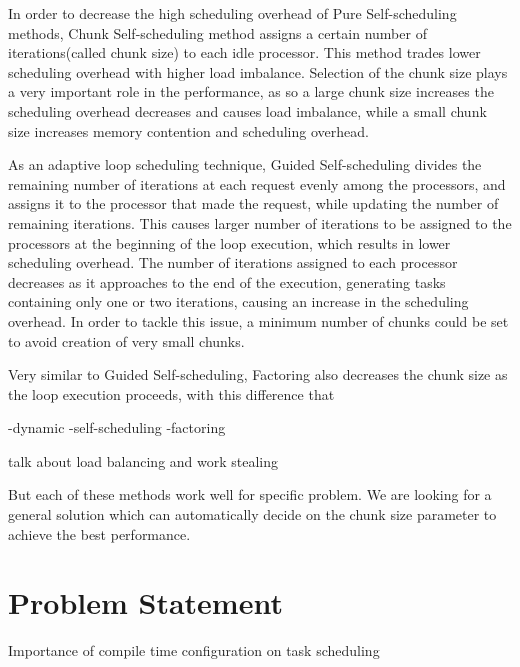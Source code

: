 In order to decrease the high scheduling overhead of Pure Self-scheduling
methods, Chunk Self-scheduling method assigns a certain number of
iterations(called chunk size) to each idle processor. This method trades lower
scheduling overhead with higher load imbalance. Selection of the chunk size
plays a very important role in the performance, as so a large chunk size
increases the scheduling overhead decreases and causes load imbalance, while a
small chunk size increases memory contention and scheduling
overhead\cite{liu1994safe}. 

As an adaptive loop scheduling technique, Guided
Self-scheduling\cite{polychronopoulos1987guided} divides the remaining number of
iterations at each request evenly among the processors, and assigns it to the
processor that made the request, while updating the number of remaining
iterations. This causes larger number of iterations to be assigned to the
processors at the beginning of the loop execution, which results in lower
scheduling overhead. The number of iterations assigned to each processor
decreases as it approaches to the end of the execution, generating tasks
containing only one or two iterations, causing an increase in the scheduling
overhead. In order to tackle this issue, a minimum number of chunks could be set
to avoid creation of very small chunks\cite{lilja1994exploiting}. 

Very similar to Guided Self-scheduling, Factoring also decreases the chunk size
as the loop execution proceeds, with this difference that   

-dynamic
-self-scheduling
-factoring

talk about load balancing and work stealing

But each of these methods work well for specific problem. We are looking for a
general solution which can automatically decide on the chunk size parameter to
achieve the best performance.

\vspace{\baselineskip}
\section{Problem Statement}
Importance of compile time configuration on task scheduling


\vspace{\baselineskip}
